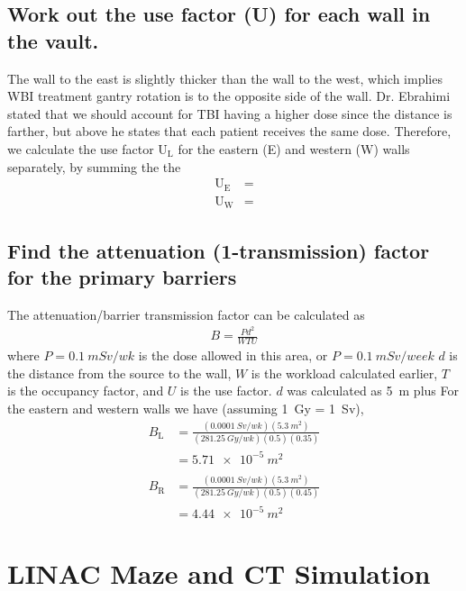 \documentclass[%
aps,
mph,%
amsmath,amssymb,
preprint,%
tightenlines,
longbibliography,
superscriptaddress,
floatfix,
nofootinbib,
]{revtex4-2}
\begin{document}
    \subsection{Work out the use factor (U) for each wall in the vault.}
    The wall to the east is slightly thicker than the wall to the west, which implies WBI treatment gantry rotation is to the opposite side of the wall. Dr. Ebrahimi stated that we should account for TBI having a higher dose since the distance is farther, but above he states that each patient receives the same dose. Therefore, we calculate the use factor $\mathrm{U_L}$ for the eastern (E) and western (W) walls separately, by summing the the 
    \begin{align*}
        \mathrm{U_E} &= \\
        \mathrm{U_W} &= 
    \end{align*}

    \subsection{Find the attenuation (1-transmission) factor for the primary barriers}
    The attenuation/barrier transmission factor can be calculated as
    \begin{align}
        B = \frac{Pd^2}{WTU}
    \end{align}
    where $P = \qty{0.1}{mSv/wk}$ is the dose allowed in this  area, or $P = \qty{0.1}{mSv/week}$ $d$ is the distance from the source to the wall, $W$ is the workload calculated earlier, $T$ is the occupancy factor, and $U$ is the use factor. $d$ was calculated as \qty{5}{m} plus  For the eastern and western walls we have (assuming \qty{1}{Gy} = \qty{1}{Sv}),
    \begin{align*}
        B_\mathrm{L} &=  \frac{\left( \qty{0.0001}{Sv/wk} \right)\left( \qty{5.3}{m^2} \right)}{\left( \qty{281.25}{Gy/wk} \right)\left( 0.5 \right)\left( 0.35 \right)} \\
        &= \SI{5.71e-5}{m^2} \\ \\ 
        B_\mathrm{R} &=  \frac{\left( \qty{0.0001}{Sv/wk} \right)\left( \qty{5.3}{m^2} \right)}{\left( \qty{281.25}{Gy/wk} \right)\left( 0.5 \right)\left( 0.45 \right)} \\
        &= \SI{4.44e-5}{m^2}       
    \end{align*}
    
    
\section{LINAC Maze and CT Simulation}
\end{document}
